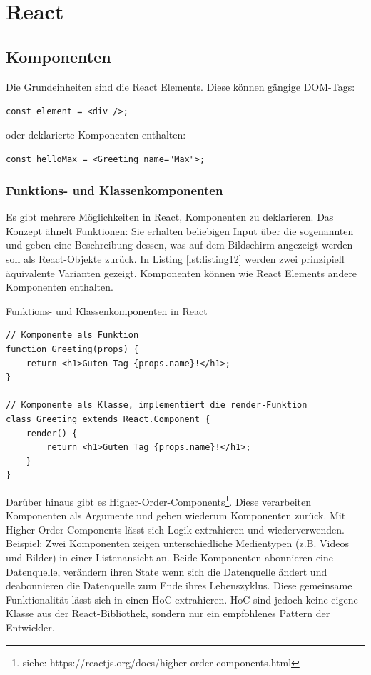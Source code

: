 \section{React}
\subsection{Komponenten}
Die Grundeinheiten sind die React Elements. Diese können gängige DOM-Tags:

\texttt{const element = <div />;}

oder deklarierte Komponenten enthalten:

\texttt{const helloMax = <Greeting name="Max">;}

\subsubsection{Funktions- und Klassenkomponenten}
Es gibt mehrere Möglichkeiten in React, Komponenten zu deklarieren. Das Konzept ähnelt Funktionen: Sie erhalten beliebigen Input über die sogenannten  und geben eine Beschreibung dessen, was auf dem Bildschirm angezeigt werden soll als React-Objekte zurück. In Listing \ref{lst:listing12} werden zwei prinzipiell äquivalente Varianten gezeigt\cite{ComponentsProps}. Komponenten können wie React Elements andere Komponenten enthalten.

\begin{listing}
\caption{Funktions- und Klassenkomponenten in React}
\label{lst:listing12}
\begin{verbatim}
// Komponente als Funktion
function Greeting(props) {
    return <h1>Guten Tag {props.name}!</h1>;
}

// Komponente als Klasse, implementiert die render-Funktion
class Greeting extends React.Component {
    render() {
        return <h1>Guten Tag {props.name}!</h1>;
    }
}
\end{verbatim}
\end{listing}

Darüber hinaus gibt es Higher-Order-Components\footnote{siehe: https://reactjs.org/docs/higher-order-components.html}. Diese verarbeiten Komponenten als Argumente und geben wiederum Komponenten zurück. Mit Higher-Order-Components lässt sich Logik extrahieren und wiederverwenden. Beispiel: Zwei Komponenten zeigen unterschiedliche Medientypen (z.B. Videos und Bilder) in einer Listenansicht an. Beide Komponenten abonnieren eine Datenquelle, verändern ihren State wenn sich die Datenquelle ändert und deabonnieren die Datenquelle zum Ende ihres Lebenszyklus. Diese gemeinsame Funktionalität lässt sich in einen HoC extrahieren. HoC sind jedoch keine eigene Klasse aus der React-Bibliothek, sondern nur ein empfohlenes Pattern der Entwickler.

